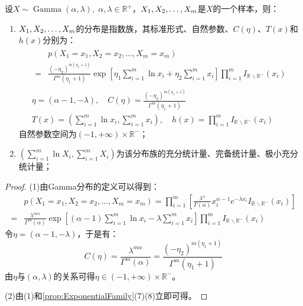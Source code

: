 \begin{theorem}
	设$X\sim\operatorname{Gamma}(\alpha,\lambda),\;\alpha,\lambda\in\mathbb{R}^{+}$，$X_1, X_2, \dots, X_{m}$是$X$的一个样本，则：
	\begin{enumerate}
		\item $X_1, X_2, \dots, X_{m}$的分布是指数族，其标准形式、自然参数、$C(\eta)$、$T(x)$和$h(x)$分别为：
		\begin{gather*}
			\begin{aligned}
				&p(X_1=x_1,X_2=x_2,\dots,X_m=x_m) \\
				=&\frac{(-\eta_2)^{m(\eta_1+1)}}{\Gamma^m(\eta_1+1)}\exp\left[\eta_1\sum_{i=1}^{m}\ln x_i+\eta_2\sum_{i=1}^{m}x_i\right]\prod_{i=1}^{m}I_{\mathbb{R}^{}\backslash\mathbb{R}^{-}}(x_i)
			\end{aligned} \\
			\eta=(\alpha-1,-\lambda),\quad C(\eta)=\frac{(-\eta_2)^{m(\eta_1+1)}}{\Gamma^m(\eta_1+1)} \\
			T(x)=\left(\sum_{i=1}^{m}\ln x_i,\sum_{i=1}^{m}x_i\right),\quad h(x)=\prod_{i=1}^{m}I_{\mathbb{R}^{}\backslash\mathbb{R}^{-}}(x_i)
		\end{gather*}
		自然参数空间为$(-1,+\infty)\times\mathbb{R}^{-}$；
		\item $\left(\sum\limits_{i=1}^{m}\ln X_i,\sum\limits_{i=1}^{m}X_i\right)$为该分布族的充分统计量、完备统计量、极小充分统计量；
	\end{enumerate}
\end{theorem}
\begin{proof}
	(1)由Gamma分布的定义可以得到：
	\begin{align*}
		&p(X_1=x_1,X_2=x_2,\dots,X_m=x_m)=\prod_{i=1}^{m}\left[\frac{\lambda^{\alpha}}{\Gamma(\alpha)}x_i^{\alpha-1}e^{-\lambda x_i}I_{\mathbb{R}^{}\backslash\mathbb{R}^{-}}(x_i)\right] \\
		=&\frac{\lambda^{m\alpha}}{\Gamma^m(\alpha)}\exp\left[(\alpha-1)\sum_{i=1}^{m}\ln x_i-\lambda\sum_{i=1}^{m}x_i\right]\prod_{i=1}^{m}I_{\mathbb{R}^{}\backslash\mathbb{R}^{-}}(x_i)
	\end{align*}
	令$\eta=(\alpha-1,-\lambda)$，于是有：
	\begin{equation*}
		C(\eta)=\frac{\lambda^{m\alpha}}{\Gamma^m(\alpha)}=\frac{(-\eta_2)^{m(\eta_1+1)}}{\Gamma^m(\eta_1+1)}
	\end{equation*}
	由$\eta$与$(\alpha,\lambda)$的关系可得$\eta\in(-1,+\infty)\times\mathbb{R}^{-}$。\par
	(2)由(1)和\cref{prop:ExponentialFamily}(7)(8)立即可得。
\end{proof}

